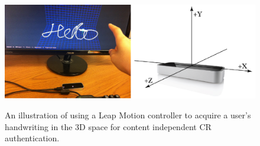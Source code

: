 \begin{figure}[t]
\vspace{-5mm}
\centering
{\includegraphics[width=.9\columnwidth]{./Graphic/SystemFlow/leap_motion_system.eps}} %
\caption{{An illustration of using a Leap Motion controller to acquire a user's handwriting in the 3D space for content independent CR authentication.}\vspace{-5mm}}\label{fig:leap}
\end{figure}





